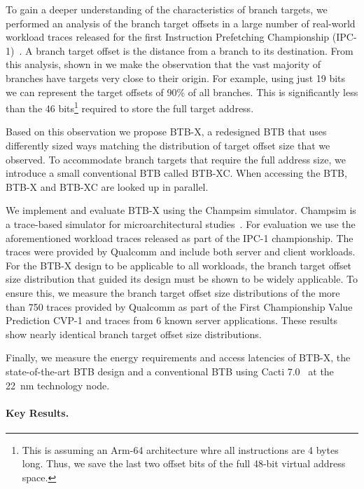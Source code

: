 \documentclass[../main.tex]{subfiles}
\begin{document}
\begin{refsection}
To gain a deeper understanding of the characteristics of branch
targets, we performed an analysis of the branch target offsets in a
large number of real-world workload traces released for the first
Instruction Prefetching Championship (IPC-1)~\cite{ipc1}. A branch
target offset is the distance from a branch to its destination. From
this analysis, shown in  we make the
observation that the vast majority of branches have targets very
close to their origin. For example, using just 19 bits we can
represent the target offsets of 90\% of all branches. This is
significantly less than the 46 bits\footnote{This is assuming an
  Arm-64 architecture whre all instructions are 4 bytes long. Thus, we
  save the last two offset bits of the full 48-bit virtual address
  space.} required to store the full target address.

Based on this observation we propose BTB-X, a redesigned BTB that uses
differently sized ways matching the distribution of target offset
size that we observed. To accommodate branch targets that require the
full address size, we introduce a small conventional BTB called
BTB-XC. When accessing the BTB, BTB-X and BTB-XC are looked up in parallel.

We implement and evaluate BTB-X using the Champsim
simulator. Champsim is a trace-based simulator for microarchitectural
studies~\cite{champsim}. For evaluation we use the aforementioned
workload traces released as part of the IPC-1 championship. The traces
were provided by Qualcomm and include both server and client
workloads. For the BTB-X design to be applicable to all workloads, the
branch target offset size distribution that guided its design must be
shown to be widely applicable. To ensure this, we measure the branch
target offset size distributions of the more than 750 traces provided by
Qualcomm as part of the First Championship Value Prediction CVP-1 and
traces from 6 known server applications. These results show nearly
identical branch target offset size distributions.

Finally, we measure the energy requirements and access latencies of
BTB-X, the state-of-the-art BTB design and a conventional BTB using Cacti 7.0~\cite{cacti} at the 22~nm technology node.

\paragraph{Key Results.}



\end{refsection}
\end{document}

